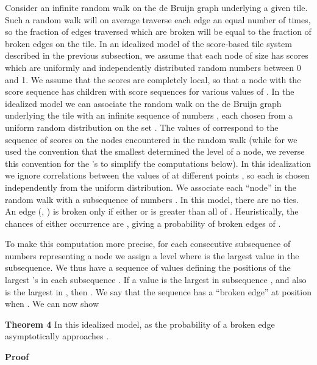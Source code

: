 \documentclass[12pt]{article}
\begin{document}
Consider an infinite random walk on the de Bruijn graph 
underlying a given tile.  Such a random walk will on average traverse
each edge an equal number of times, so the fraction of edges traversed
which are broken will be equal to the fraction of broken edges on the
tile.  In an idealized model of the score-based tile system described
in the previous subsection, we assume that each node of size  has
scores  which are uniformly and independently distributed
random numbers between 0 and 1.  We assume that the scores are
completely local, so that a node with the score sequence  has children with score sequences  for various values of .  In the idealized
model we can associate the random walk on the de Bruijn graph
underlying the tile with an infinite sequence of numbers , each chosen from a uniform random distribution on the set
.  The values of  correspond to the sequence of scores
 on the nodes encountered in the random walk (while for
   we used the convention that the smallest  determined
  the level of a node, we reverse this convention for the 's to
  simplify the computations below).  In this
idealization we ignore correlations between the values of  at
different points , so each  is chosen independently from the
uniform distribution.  We associate each ``node'' in the random walk
with a subsequence of  numbers  .  In this model, there are no ties.  An edge (, ) is broken only if either  or
 is greater than all of .  Heuristically,
the chances of either occurrence are , giving a probability of
broken edges of .

To make this computation more precise, for each consecutive
subsequence of  numbers   representing a node we assign a level  where  is the
largest value in the subsequence.  We thus have a sequence of values
 defining the positions of the largest 's in each
subsequence .  If a value  is the largest  in
subsequence , and also is the largest  in , then .  We say that the sequence has a ``broken edge''
at position  when .  We can now show
\vspace*{0.1in}

\noindent
{\bf Theorem 4} In this idealized model, as  the
probability of a broken edge asymptotically approaches .

\vspace*{0.1in}

\noindent
{\bf Proof}
\end{document}
